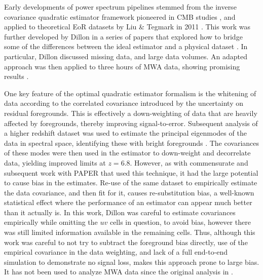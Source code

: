 Early developments of power spectrum pipelines stemmed from the inverse covariance quadratic estimator framework pioneered in CMB studies \cite{tegmark97}, and applied to theoretical EoR datasets by Liu \& Tegmark in 2011 \cite{liu11}. This work was further developed by Dillon in a series of papers that explored how to bridge some of the differences between the ideal estimator and a physical dataset \cite{dillon15,dillon13}. In particular, Dillon discussed missing data, and large data volumes. An adapted approach was then applied to three hours of MWA data, showing promising results \cite{dillon13}. 

One key feature of the optimal quadratic estimator formalism is the whitening of data according to the correlated covariance introduced by the uncertainty on residual foregrounds. This is effectively a down-weighting of data that are heavily affected by foregrounds, thereby improving signal-to-error. Subsequent analysis of a higher redshift dataset was used to estimate the principal eigenmodes of the data in spectral space, identifying these with bright foregrounds \cite{dillon15}. 
The covariances of these modes were then used in the estimator to down-weight and decorrelate data, yielding improved limits at $z=6.8$. However, as with commensurate and subsequent work with PAPER that used this technique, it had the large potential to cause bias in the estimates. Re-use of the same dataset to empirically estimate the data covariance, and then fit for it, causes re-substitution bias, a well-known statistical effect where the performance of an estimator can appear much better than it actually is. In this work, Dillon was careful to estimate covariances empirically while omitting the $uv$ cells in question, to avoid bias, however there was still limited information available in the remaining cells. Thus, although this work was careful to not try to subtract the foreground bias directly, use of the empirical covariance in the data weighting, and lack of a full end-to-end simulation to demonstrate no signal loss, makes this approach prone to large bias.  It has not been used to analyze MWA data since the original analysis in \cite{dillon15}.

